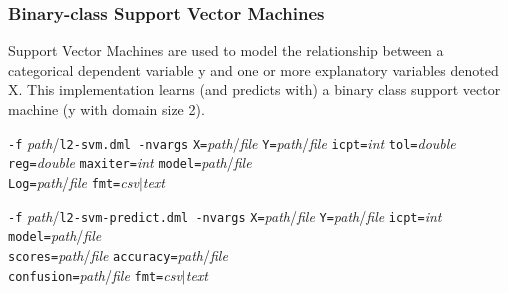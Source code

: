 \subsubsection{Binary-class Support Vector Machines}
\label{l2svm}


Support Vector Machines are used to model the relationship between a categorical 
dependent variable y and one or more explanatory variables denoted X. This 
implementation learns (and predicts with) a binary class support vector machine 
(y with domain size 2).
\\


\begin{tabbing}
\texttt{-f} \textit{path}/\texttt{l2-svm.dml -nvargs} 
\=\texttt{X=}\textit{path}/\textit{file} 
  \texttt{Y=}\textit{path}/\textit{file} 
  \texttt{icpt=}\textit{int} 
  \texttt{tol=}\textit{double}\\
\>\texttt{reg=}\textit{double} 
  \texttt{maxiter=}\textit{int} 
  \texttt{model=}\textit{path}/\textit{file}\\
\>\texttt{Log=}\textit{path}/\textit{file}
  \texttt{fmt=}\textit{csv}$\vert$\textit{text}
\end{tabbing}

\begin{tabbing}
\texttt{-f} \textit{path}/\texttt{l2-svm-predict.dml -nvargs} 
\=\texttt{X=}\textit{path}/\textit{file} 
  \texttt{Y=}\textit{path}/\textit{file} 
  \texttt{icpt=}\textit{int} 
  \texttt{model=}\textit{path}/\textit{file}\\
\>\texttt{scores=}\textit{path}/\textit{file}
  \texttt{accuracy=}\textit{path}/\textit{file}\\
\>\texttt{confusion=}\textit{path}/\textit{file}
  \texttt{fmt=}\textit{csv}$\vert$\textit{text}
\end{tabbing}



